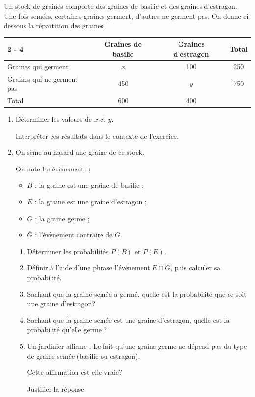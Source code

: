 Un stock de  graines comporte des graines de basilic et des graines d'estragon. Une fois semées, certaines graines germent, d'autres ne germent pas. On donne ci-dessous la répartition des  graines.

\begin{center}
\begin{tabular}{|l|c|c|c|}
	\cline
	{ 2 - 4 }
\multicolumn{1}{c|}{} & Graines de basilic & Graines d'estragon &   Total   \\
	\hline
	Graines qui germent             & $x$ & 100 & 250 \\
	\hline
	Graines qui ne germent pas      & 450 & $y$ & 750  \\
	\hline
	Total                           & 600 & 400 & \np{1000} \\
	\hline
\end{tabular}
\end{center}

\begin{enumerate}
\item Déterminer les valeurs de $x$ et $y$.

Interpréter ces résultats dans le contexte de l'exercice.
\item On sème au hasard une graine de ce stock.

On note les évènements :

\begin{itemize}[label={\textbullet~}]
	\item $B$	: \og la graine est une graine de basilic \fg{};
	\item $E$ : \og la graine est une graine d'estragon \fg{};
	\item $G$ : \og la graine germe \fg{};
	\item $\overline{G}$ : l'évènement contraire de $G$.
\end{itemize}

\begin{enumerate}
	\item Déterminer les probabilités $P(B)$ et $P(E)$.

	\item Définir à l'aide d'une phrase l'évènement $E \cap G$, puis calculer sa probabilité.

	\item Sachant que la graine semée a germé, quelle est la probabilité que ce soit une graine d'estragon?

	\item Sachant que la graine semée est une graine d'estragon, quelle est la probabilité qu'elle germe ?

	\item Un jardinier affirme : \og Le fait qu'une graine germe ne dépend pas du type de graine semée (basilic ou estragon). \fg

	Cette affirmation est-elle vraie?

	Justifier la réponse.

	\end{enumerate}
\end{enumerate}
